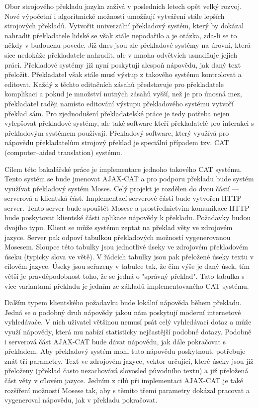 \documentclass[12pt,a4paper]{report}
\begin{document}
Obor strojového překladu jazyka zažívá v posledních letech opět velký rozvoj. Nové výpočetní i algoritmické možnosti umožňují vytváření stále lepších strojových překladů. Vytvořit univerzální překladový systém, který by dokázal nahradit překladatele lidské se však stále nepodařilo a je otázka, zda-li se to někdy v budoucnu povede. Již dnes jsou ale překladové systémy na úrovni, která sice nedokáže překladatele nahradit, ale v mnoha odvětvích usnadňuje jejich práci. Překladové systémy již nyní poskytují alespoň nápovědu, jak daný text přeložit. Překladatel však stále musí výstup z takového systému kontrolovat a editovat. Každý z těchto editačních zásahů představuje pro překladatele komplikaci a pokud je množství nutných zásahů vyšší, než je pro únosná mez, překladatel raději namísto editování výstupu překladového systému vytvoří překlad sám. Pro zjednodušení překladatelské práce je tedy potřeba nejen vylepšovat překladové systémy, ale také software kteří překladatelé pro interakci s překladovým systémem používají. Překladový software, který využívá pro nápovědu překladatelům strojový překlad je speciální případem tzv. CAT (computer--aided translation) systému.

Cílem této bakalářské práce je implementace jednoho takového CAT systému. Tento systém se bude jmenovat AJAX-CAT a pro podporu překladu bude systém využívat překladový systém Moses. Celý projekt je rozdělen do dvou částí --- serverová a klientská část. Implementací serverové části bude vytvořen HTTP server. Tento server bude spouštět Mosese a prostřednictvím komunikace HTTP bude poskytovat klientské části aplikace nápovědy k překladu. Požadavky budou dvojího typu. Klient se může systému zeptat na překlad věty ve zdrojovém jazyce. Server pak odpoví tabulkou překladových možností vygenerovanou Mosesem. Sloupce této tabulky jsou jednotlivé úseky ve zdrojovém překladovém úseku (typicky slova ve větě). V řádcích tabulky jsou pak přeložené úseky textu v cílovém jazyce. Úseky jsou seřazeny v tabulce tak, že čím výše je daný úsek, tím větší je pravděpodobnost toho, že se jedná o "správný překlad". Tato tabulka s více variantami překladu je jedním ze základů implementovaného CAT systému.

Dalším typem klientského požadavku bude lokální nápověda během překladu. Jedná se o podobný druh nápovědy jakou nám poskytují moderní internetové vyhledávače. V nich uživatel většinou nemusí psát celý vyhledávací dotaz a může využí nápovědy, která mu nabízí statisticky nejčastější podobné dotazy. Podobně i serverová část AJAX-CAT bude dávat nápovědu, jak dále pokračovat s překladem. Aby překladový systém mohl tuto nápovědu poskytnout, potřebuje znát tři parametry. Text ve zdrojovém jazyce, vektor určující, které úseky jsou již přeloženy (překlad často nezachovává slovosled původního textu) a již přeložená část věty v cílovém jazyce. Jedním z cílů při implementaci AJAX-CAT je také rozšíření možností Mosese tak, aby s těmito třemi parametry dokázal pracovat a vygeneroval nápovědu, jak v překladu pokračovat.
\end{document}
